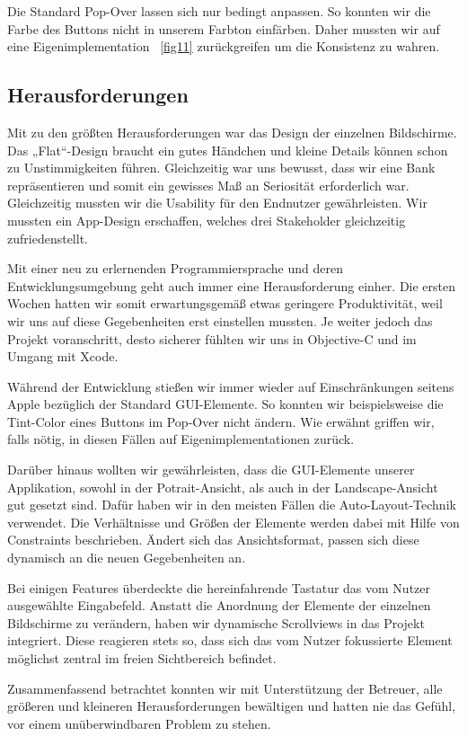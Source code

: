 Die Standard Pop-Over lassen sich nur bedingt anpassen. So konnten wir die Farbe des Buttons nicht in unserem Farbton einfärben. Daher mussten wir auf eine Eigenimplementation ~\ref{fig11} zurückgreifen um die Konsistenz zu wahren.


\subsection{Herausforderungen}
	Mit zu den größten Herausforderungen war das Design der einzelnen Bildschirme. Das „Flat“-Design braucht ein gutes Händchen und kleine Details können schon zu Unstimmigkeiten führen. Gleichzeitig war uns bewusst, dass wir eine Bank repräsentieren und somit ein gewisses Maß an Seriosität erforderlich war. Gleichzeitig mussten wir die Usability für den Endnutzer gewährleisten. Wir mussten ein App-Design erschaffen, welches drei Stakeholder gleichzeitig zufriedenstellt.

	Mit einer neu zu erlernenden Programmiersprache und deren Entwicklungsumgebung geht auch immer eine Herausforderung einher. Die ersten Wochen hatten wir somit erwartungsgemäß etwas geringere Produktivität, weil wir uns auf diese Gegebenheiten erst einstellen mussten. Je weiter jedoch das Projekt voranschritt, desto sicherer fühlten wir uns in Objective-C und im Umgang mit Xcode.

	Während der Entwicklung stießen wir immer wieder auf Einschränkungen seitens Apple bezüglich der Standard GUI-Elemente. So konnten wir beispielsweise die Tint-Color eines Buttons im Pop-Over nicht ändern. Wie erwähnt griffen wir, falls nötig, in diesen Fällen auf Eigenimplementationen zurück.
	
	Darüber hinaus wollten wir gewährleisten, dass die GUI-Elemente unserer Applikation, sowohl in der Potrait-Ansicht, als auch in der Landscape-Ansicht gut gesetzt sind. Dafür haben wir in den meisten Fällen die Auto-Layout-Technik verwendet. Die Verhältnisse und Größen der Elemente werden dabei mit Hilfe von Constraints beschrieben. Ändert sich das Ansichtsformat, passen sich diese dynamisch an die neuen Gegebenheiten an.
	
	Bei einigen Features überdeckte die hereinfahrende Tastatur das vom Nutzer ausgewählte Eingabefeld. Anstatt die Anordnung der Elemente der einzelnen Bildschirme zu verändern, haben wir dynamische Scrollviews in das Projekt integriert. Diese reagieren stets so, dass sich das vom Nutzer fokussierte Element möglichst zentral im freien Sichtbereich befindet.

	Zusammenfassend betrachtet konnten wir mit Unterstützung der Betreuer, alle größeren und kleineren Herausforderungen bewältigen und hatten nie das Gefühl, vor einem unüberwindbaren Problem zu stehen.
	
	